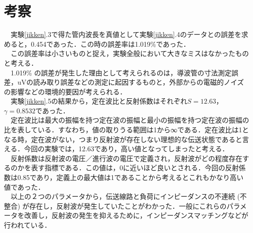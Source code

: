 \newpage
\section{考察}
　実験\ref{jikken}.3で得た管内波長を真値として実験\ref{jikken}.4のデータとの誤差を求めると，0.454であった．この時の誤差率は1.019\%であった．\\
　この誤差率は小さいものと捉え，実験全般において大きなミスはなかったものと考える．\\
　1.019\% の誤差が発生した理由として考えられるのは，導波管の寸法測定誤差，uVの読み取り誤差などの測定に起因するものと，外部からの電磁的ノイズの影響などの環境的要因が考えられる．\\

　実験\ref{jikken}.5の結果から，定在波比と反射係数はそれぞれ$S=12.63$，$\gamma=0.8532$であった．\\
　定在波比は最大の振幅を持つ定在波の振幅と最小の振幅を持つ定在波の振幅の比を表している．すなわち，値の取りうる範囲は1から∞である．定在波比は1となる時，定在波がない，つまり反射波が存在しない理想的な伝送状態であると言える．今回の実験では，12.63であり，高い値となってしまったと考える．\\
　反射係数は反射波の電圧／進行波の電圧で定義され，反射波がどの程度存在するのかを表す指標である．この値は，0に近いほど良いとされる．今回の反射係数は0.85であり，定義上の最大値は1であることから考えるとこれもかなり高い値であった．\\
　以上の２つのパラメータから，伝送線路と負荷にインピーダンスの不連続 (不整合) が存在し，反射波が発生していたことがわかった．一般にこれらのパラメータを改善し，反射波の発生を抑えるために，インピーダンスマッチングなどが行われている．\\



